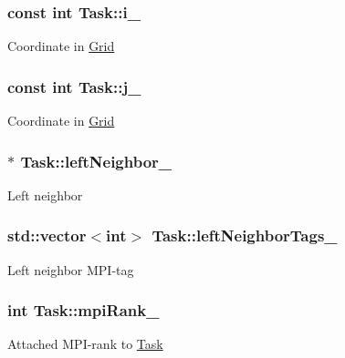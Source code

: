 \subsubsection[{\texorpdfstring{i\+\_\+}{i_}}]{\setlength{\rightskip}{0pt plus 5cm}const int Task\+::i\+\_\+\hspace{0.3cm}{\ttfamily [private]}}\hypertarget{classTask_aa454be94224aebece247cf0cd23fcffc}{}\label{classTask_aa454be94224aebece247cf0cd23fcffc}
Coordinate in \hyperlink{classGrid}{Grid} 
\subsubsection[{\texorpdfstring{j\+\_\+}{j_}}]{\setlength{\rightskip}{0pt plus 5cm}const int Task\+::j\+\_\+\hspace{0.3cm}{\ttfamily [private]}}\hypertarget{classTask_aced73e768f619c3b56184befe3691aaf}{}\label{classTask_aced73e768f619c3b56184befe3691aaf}
Coordinate in \hyperlink{classGrid}{Grid} 
\subsubsection[{\texorpdfstring{left\+Neighbor\+\_\+}{leftNeighbor_}}]{$\ast$ Task\+::left\+Neighbor\+\_\+\hspace{0.3cm}{\ttfamily [private]}}\hypertarget{classTask_a1a33c520e485401263ef144361e18dde}{}\label{classTask_a1a33c520e485401263ef144361e18dde}
Left neighbor 
\subsubsection[{\texorpdfstring{left\+Neighbor\+Tags\+\_\+}{leftNeighborTags_}}]{\setlength{\rightskip}{0pt plus 5cm}std\+::vector$<$int$>$ Task\+::left\+Neighbor\+Tags\+\_\+\hspace{0.3cm}{\ttfamily [private]}}\hypertarget{classTask_a0968fecb0e49a48f4af6824fd513f752}{}\label{classTask_a0968fecb0e49a48f4af6824fd513f752}
Left neighbor M\+P\+I-\/tag 
\subsubsection[{\texorpdfstring{mpi\+Rank\+\_\+}{mpiRank_}}]{\setlength{\rightskip}{0pt plus 5cm}int Task\+::mpi\+Rank\+\_\+\hspace{0.3cm}{\ttfamily [private]}}\hypertarget{classTask_aa303576fad66710bd6d36f1487b8fb3f}{}\label{classTask_aa303576fad66710bd6d36f1487b8fb3f}
Attached M\+P\+I-\/rank to \hyperlink{classTask}{Task} 
